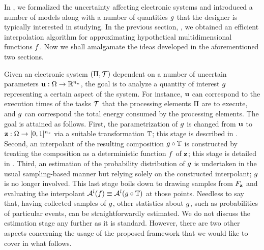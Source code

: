In , we formalized the uncertainty affecting electronic systems
and introduced a number of models along with a number of quantities $g$ that
the designer is typically interested in studying. In the previous section,
, we obtained an efficient interpolation algorithm for
approximating hypothetical multidimensional functions $f$. Now we shall
amalgamate the ideas developed in the aforementioned two sections.

Given an electronic system $(\Pi, \mathcal{T})$ dependent on a number of uncertain
parameters $\mathbf{u}: \Omega \to \mathbb{R}^{n_u}$, the goal is to analyze a quantity of
interest $g$ representing a certain aspect of the system. For instance, $\mathbf{u}$
can correspond to the execution times of the tasks $\mathcal{T}$ that the processing
elements $\Pi$ are to execute, and $g$ can correspond the total energy
consumed by the processing elements. The goal is attained as follows. First, the
parametrization of $g$ is changed from $\mathbf{u}$ to \rvs\ $\mathbf{z}: \Omega \to [0,
1]^{n_z}$ via a suitable transformation $\mathbb{T}$; this stage is described
in . Second, an interpolant of the resulting
composition $g \circ \mathbb{T}$ is constructed by treating the
composition as a deterministic function $f$ of $\mathbf{z}$; this stage is detailed in
. Third, an estimation of the probability distribution of
$g$ is undertaken in the usual sampling-based manner but relying solely on the
constructed interpolant; $g$ is no longer involved. This last stage boils down
to drawing samples from $F_{\mathbf{z}}$ and evaluating the interpolant
$\mathcal{A}^{l}(f) \equiv \mathcal{A}^{l}(g \circ \mathbb{T})$ at those points.
Needless to say that, having collected samples of $g$, other statistics about
$g$, such as probabilities of particular events, can be straightforwardly
estimated. We do not discuss the estimation stage any further as it is standard.
However, there are two other aspects concerning the usage of the proposed
framework that we would like to cover in what follows.

